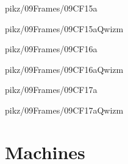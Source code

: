 \documentclass[9pt,xcolor={svgnames, x11names}]{beamer}
\begin{document}

\begin{frame}{pikz/09Frames/09CF15a}
	
\end{frame}


\begin{frame}{pikz/09Frames/09CF15aQwizm}
	
\end{frame}


\begin{frame}{pikz/09Frames/09CF16a}
	
\end{frame}


\begin{frame}{pikz/09Frames/09CF16aQwizm}
	
\end{frame}


\begin{frame}{pikz/09Frames/09CF17a}
	
\end{frame}


\begin{frame}{pikz/09Frames/09CF17aQwizm}
	
\end{frame}



\section{Machines}
\end{document}
